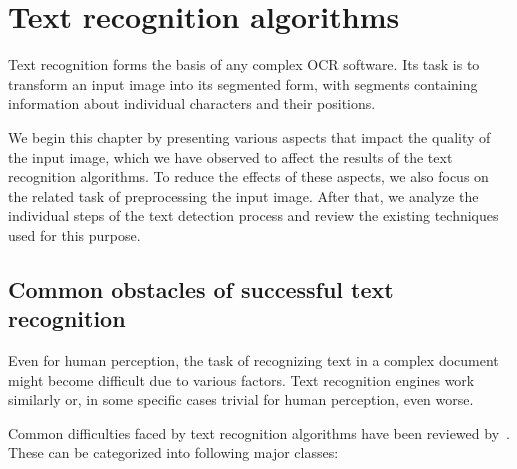 \chapter{Text recognition algorithms}

Text recognition forms the basis of any complex OCR software. Its task is to transform an input image into its segmented form, with segments containing information about individual characters and their positions.

We begin this chapter by presenting various aspects that impact the quality of the input image, which we have observed to affect the results of the text recognition algorithms. To reduce the effects of these aspects, we also focus on the related task of preprocessing the input image. After that, we analyze the individual steps of the text detection process and review the existing techniques used for this purpose.
	
\section{Common obstacles of successful text recognition}

Even for human perception, the task of recognizing text in a complex document might become difficult due to various factors. Text recognition engines work similarly or, in some specific cases trivial for human perception, even worse.

Common difficulties faced by text recognition algorithms have been reviewed by~\citet{preprocessAll}. These can be categorized into following major classes:

